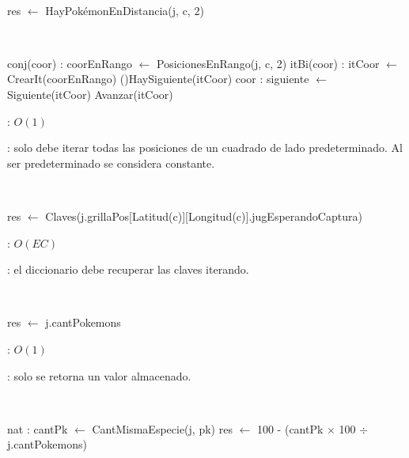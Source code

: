 \begin{Algoritmos}
	~

	\begin{algorithm}[H]
		\NoCaptionOfAlgo
		\caption{}
		res $\leftarrow$ HayPokémonEnDistancia(j, c, 2)
	\end{algorithm}

	~

	\begin{algorithm}[H]
		\NoCaptionOfAlgo
		\caption{}
		conj(coor) : coorEnRango $\leftarrow$ PosicionesEnRango(j, c, 2)
		itBi(coor) : itCoor $\leftarrow$ CrearIt(coorEnRango)
		\While(){HaySiguiente(itCoor)}{
			coor : siguiente $\leftarrow$ Siguiente(itCoor)
			Avanzar(itCoor)
		}
	\end{algorithm}

	\complejidad: $O(1)$

	\justifcomp: solo debe iterar todas las posiciones de un cuadrado de lado predeterminado. Al ser predeterminado se considera constante.

	~

	\begin{algorithm}[H]
		\NoCaptionOfAlgo
		\caption{}
		res $\leftarrow$ Claves(j.grillaPos[Latitud(c)][Longitud(c)].jugEsperandoCaptura)
	\end{algorithm}

	\complejidad: $O(EC)$

	\justifcomp: el diccionario debe recuperar las claves iterando.

	~

	\begin{algorithm}[H]
		\NoCaptionOfAlgo
		\caption{}
		res $\leftarrow$ j.cantPokemons
	\end{algorithm}

	\complejidad: $O(1)$

	\justifcomp: solo se retorna un valor almacenado.

	~

	\begin{algorithm}[H]
		\NoCaptionOfAlgo
		\caption{}
		nat : cantPk $\leftarrow$ CantMismaEspecie(j, pk)
		res $\leftarrow$ 100 - (cantPk $\times$ 100 $\div$ j.cantPokemons)
	\end{algorithm}


\end{Algoritmos}
